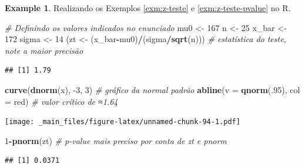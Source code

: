 \documentclass[
]{book}
\newenvironment{Shaded}{\begin{snugshade}}{\end{snugshade}}
\newcommand{\CommentTok}[1]{\textcolor[rgb]{0.56,0.35,0.01}{\textit{#1}}}
\newcommand{\DataTypeTok}[1]{\textcolor[rgb]{0.13,0.29,0.53}{#1}}
\newcommand{\DecValTok}[1]{\textcolor[rgb]{0.00,0.00,0.81}{#1}}
\newcommand{\KeywordTok}[1]{\textcolor[rgb]{0.13,0.29,0.53}{\textbf{#1}}}
\newcommand{\NormalTok}[1]{#1}
\newcommand{\OperatorTok}[1]{\textcolor[rgb]{0.81,0.36,0.00}{\textbf{#1}}}
\newcommand{\StringTok}[1]{\textcolor[rgb]{0.31,0.60,0.02}{#1}}
\theoremstyle{definition}
\theoremstyle{definition}
\newtheorem{example}{Example}[chapter]
\theoremstyle{definition}
\theoremstyle{remark}
\begin{document}
\begin{example}
\protect\hypertarget{exm:z-teste-r}{}{\label{exm:z-teste-r} }Realizando os Exemplos \ref{exm:z-teste} e \ref{exm:z-teste-pvalue} no R.
\end{example}

\begin{Shaded}
\begin{Highlighting}[]
\CommentTok{\# Definindo os valores indicados no enunciado}
\NormalTok{mu0 \textless{}{-}}\StringTok{ }\DecValTok{167}
\NormalTok{n \textless{}{-}}\StringTok{ }\DecValTok{25}
\NormalTok{x\_bar \textless{}{-}}\StringTok{ }\DecValTok{172}
\NormalTok{sigma \textless{}{-}}\StringTok{ }\DecValTok{14}
\NormalTok{(zt \textless{}{-}}\StringTok{ }\NormalTok{(x\_bar}\OperatorTok{{-}}\NormalTok{mu0)}\OperatorTok{/}\NormalTok{(sigma}\OperatorTok{/}\KeywordTok{sqrt}\NormalTok{(n))) }\CommentTok{\# estatística do teste, note a maior precisão}
\end{Highlighting}
\end{Shaded}

\begin{verbatim}
## [1] 1.79
\end{verbatim}

\begin{Shaded}
\begin{Highlighting}[]
\KeywordTok{curve}\NormalTok{(}\KeywordTok{dnorm}\NormalTok{(x), }\DecValTok{{-}3}\NormalTok{, }\DecValTok{3}\NormalTok{) }\CommentTok{\# gráfico da normal padrão}
\KeywordTok{abline}\NormalTok{(}\DataTypeTok{v =} \KeywordTok{qnorm}\NormalTok{(.}\DecValTok{95}\NormalTok{), }\DataTypeTok{col =} \StringTok{\textquotesingle{}red\textquotesingle{}}\NormalTok{) }\CommentTok{\# valor crítico de ≈1.64}
\end{Highlighting}
\end{Shaded}

\texttt{[image: \_main\_files/figure-latex/unnamed-chunk-94-1.pdf]}

\begin{Shaded}
\begin{Highlighting}[]
\DecValTok{1}\OperatorTok{{-}}\KeywordTok{pnorm}\NormalTok{(zt) }\CommentTok{\# p{-}value mais preciso por conta de zt e pnorm}
\end{Highlighting}
\end{Shaded}

\begin{verbatim}
## [1] 0.0371
\end{verbatim}
\end{document}
